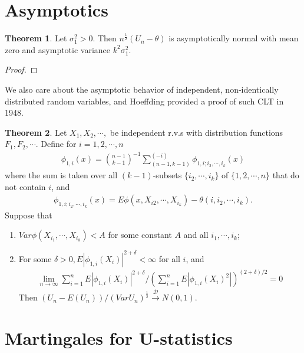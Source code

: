 \documentclass{article}
\theoremstyle{definition}
\newtheorem{theorem}{Theorem}
\numberwithin{Def}{section}
\begin{document}
    
    
    \section{Asymptotics} 
    \begin{theorem}
    Let $\sigma_1^{2} > 0$. Then $n^{\frac{1}{2}}(U_n - \theta)$ is asymptotically normal with mean zero and asymptotic variance $k^2 \sigma_1^2$.
    \end{theorem}
    
    \begin{proof}
    
    \end{proof}
    
    
    We also care about the asymptotic behavior of independent, non-identically distributed random variables, and Hoeffding provided a proof of such CLT in 1948. 
    \begin{theorem}
    Let $X_1, X_2, \cdots,$ be independent r.v.s with distribution functions $F_1, F_2, \cdots$. Define for $i = 1,2, \cdots, n$
    \begin{align}
        \phi_{1,i} (x) = {n-1 \choose k-1}^{-1} \sum_{(n-1, k-1)}^{(-i)} \phi_{1, i; i_2, \cdots, i_k}(x)
    \end{align}
    where the sum is taken over all $(k-1)$-subsets $\{i_2, \cdots, i_k\}$ of $\{1,2, \cdots, n\}$ that do not contain $i$, and 
    \begin{align}
        \phi_{1, i; i_2, \cdots, i_k}(x) = E \phi(x, X_{i2}, \cdots, X_{i_k}) - \theta(i, i_2, \cdots, i_k).
    \end{align}
    Suppose that 
    \begin{enumerate}[label = (\roman*)]
        \item $Var \phi(X_{i_1}, \cdots, X_{i_k} ) < A$ for some constant $A$ and all $i_1, \cdots, i_k$;
        \item For some $\delta > 0, E|\phi_{1, i} (X_i) |^{2 + \delta} < \infty$ for all $i$, and 
        \begin{align}
            \lim_{n \rightarrow \infty} \sum_{i =1}^{n} E|\phi_{1, i} (X_i) |^{2 + \delta} \Big/ (\sum_{i =1}^{n} E|\phi_{1, i} (X_i)^2 |) ^{(2 + \delta)/2} = 0
        \end{align}
       Then $(U_n - E(U_n)) / (Var U_n)^{\frac{1}{2}} \xrightarrow{\mathcal{D}} N(0,1).$ 
    \end{enumerate}
    \end{theorem}
\section{Martingales for U-statistics}
\end{document}
